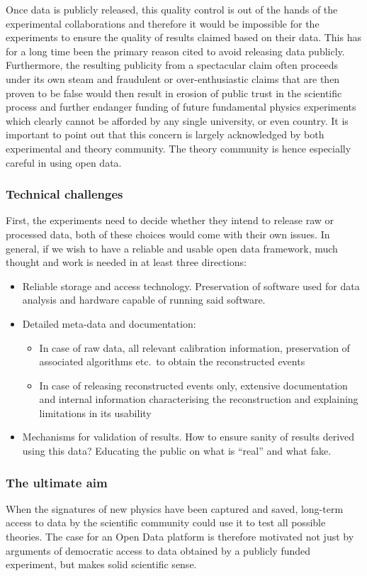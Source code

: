 \documentclass[10pt]{article}
\begin{document}
Once data is publicly released, this quality control is out of the hands of the experimental collaborations and therefore it would be impossible for the experiments to ensure the quality of results claimed based on their data. This has for a long time been the primary reason cited to avoid releasing data publicly.   
Furthermore, the resulting publicity from a spectacular claim often proceeds under its own steam and fraudulent or over-enthusiastic claims that are then proven to be false would then result in erosion of public trust in the scientific process and further endanger funding of future fundamental physics experiments which clearly cannot be afforded by any single university, or even country. It is important to point out that this concern is largely acknowledged by both experimental and theory community. The theory community is hence especially careful in using open data.


\subsubsection{Technical challenges}
%
First, the experiments need to decide whether they intend to release raw or processed data, both of these choices would come with their own issues. In general, if we wish to have a reliable and usable open data framework, much thought and work is needed in at least three directions:
\begin{itemize}
	\item Reliable storage and access technology.  Preservation of software used for data analysis and hardware capable of running said software.
	\item Detailed meta-data and documentation: \begin{itemize}
		\item In case of raw data, all relevant calibration information, preservation of associated algorithms etc.\ to obtain the reconstructed events
		\item In case of releasing reconstructed events only, extensive documentation and internal information characterising the reconstruction and explaining limitations in its usability
	\end{itemize} 
	\item Mechanisms for validation of results. How to ensure sanity of results derived using this data?  Educating the public on what is ``real'' and what fake.
\end{itemize}


\subsubsection{The ultimate aim}
%
When the signatures of new physics have been captured and saved, long-term access to data by the scientific community could use it to test all possible theories.  The case for an Open Data platform is therefore motivated not just by arguments of democratic access to data obtained by a publicly funded experiment, but makes solid scientific sense. 
\end{document}
